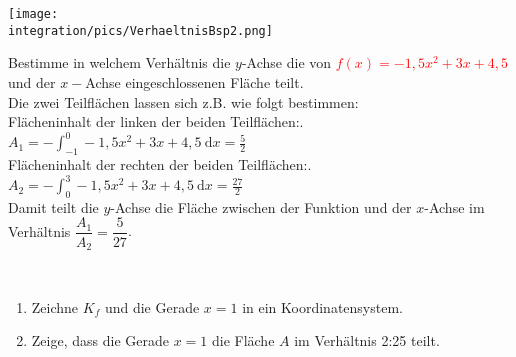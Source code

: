 \documentclass[a4paper,12pt, headsepline, ngerman]{scrartcl}
\theoremstyle{definition}
\newcommand{\td}{\ \text{d}}
\begin{document}
\begin{minipage}{\textwidth}
	\begin{minipage}{.4\textwidth}
		\texttt{[image: \\integration/pics/VerhaeltnisBsp2.png]}
	\end{minipage}
	\begin{minipage}{.6\textwidth}\raggedright
		Bestimme in welchem Verhältnis die \(y\)-Achse die von \textcolor{red}{\(f(x)=-1,5x^2+3x+4,5\)} und der \(x-\)Achse eingeschlossenen Fläche teilt.\\
		\textcolor{loes}{Die zwei Teilflächen lassen sich z.B. wie folgt bestimmen:}\\
		\textcolor{loes}{Flächeninhalt der linken der beiden Teilflächen:}.\\
		\textcolor{loes}{\(\displaystyle A_1=-\int_{-1}^0 -1,5x^2+3x+4,5 \td x=\frac{5}{2}\)}\\
		\textcolor{loes}{Flächeninhalt der rechten der beiden Teilflächen:}.\\
		\textcolor{loes}{\(\displaystyle A_2=-\int_0^3 -1,5x^2+3x+4,5 \td x=\frac{27}{2}\)}\\
		\textcolor{loes}{Damit teilt die \(y\)-Achse die Fläche zwischen der Funktion und der \(x\)-Achse im Verhältnis \(\dfrac{A_1}{A_2}=\dfrac{5}{27}\)}.\\
	\end{minipage}
\end{minipage}\vspace{\baselineskip}\\
\newpage

\begin{Exercise}[title={\raggedright\normalfont Gegeben sind die Gerade \(x=1\) und die Funktion \(f(x)=-\frac{1}{2}x^2+3x\), ihr Schaubild sei \(K_f\) Die Fläche \(A\) sei die von \(K_f\) und der \(x\)-Achse eingeschlossene Fläche.}, label=verhaltnisFlaechenA1]
\begin{enumerate}[label=\alph*)]
	\item Zeichne \(K_f\) und die Gerade \(x=1\) in ein Koordinatensystem.
	\item Zeige, dass die Gerade \(x=1\) die Fläche \(A\) im Verhältnis 2:25 teilt.
\end{enumerate}
\end{Exercise}
\end{document}
